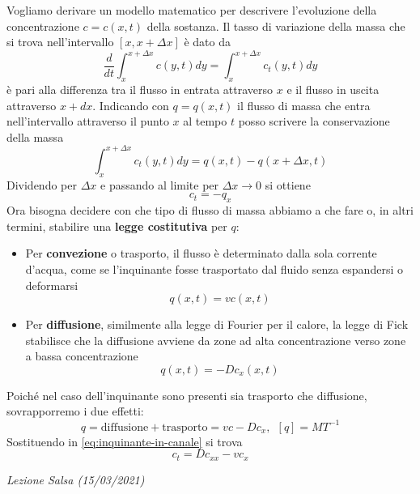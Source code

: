 \documentclass[10pt,a4paper,twoside,openright]{book}
\newcounter{conteggioS}
\newcommand{\LezioneS}[1]{
	\stepcounter{conteggioS}
	\textit{Lezione Salsa \arabic{conteggioS} (#1)}
	}
\begin{document}
Vogliamo derivare un modello matematico per descrivere l'evoluzione della concentrazione $\displaystyle c=c(x,t)$ della sostanza. Il tasso di variazione della massa che si trova nell'intervallo $\displaystyle [ x,x+\Delta x]$ è dato da
\begin{equation*}
\frac{d}{dt}\int ^{x+\Delta x}_{x} c(y,t) dy=\int ^{x+\Delta x}_{x} c_{t}(y,t) dy
\end{equation*}
è pari alla differenza tra il flusso in entrata attraverso $\displaystyle x$ e il flusso in uscita attraverso $\displaystyle x+dx$. Indicando con $\displaystyle q=q(x,t)$ il flusso di massa che entra nell'intervallo attraverso il punto $\displaystyle x$ al tempo $\displaystyle t$ posso scrivere la conservazione della massa
\begin{equation*}
\int ^{x+\Delta x}_{x} c_{t}(y,t) dy=q(x,t) -q(x+\Delta x,t)
\end{equation*}
Dividendo per $\displaystyle \Delta x$ e passando al limite per $\displaystyle \Delta x\rightarrow 0$ si ottiene
\begin{equation}
c_{t} =-q_{x}
\label{eq:inquinante-in-canale}
\end{equation}
Ora bisogna decidere con che tipo di flusso di massa abbiamo a che fare o, in altri termini, stabilire una \textbf{legge costitutiva }per $\displaystyle q$:
\begin{itemize}
\item Per \textbf{convezione} o trasporto, il flusso è determinato dalla sola corrente d'acqua, come se l'inquinante fosse trasportato dal fluido senza espandersi o deformarsi\begin{equation*}
q(x,t) =vc(x,t)
\end{equation*}
\item Per \textbf{diffusione}, similmente alla legge di Fourier per il calore, la legge di Fick stabilisce che la diffusione avviene da zone ad alta concentrazione verso zone a bassa concentrazione\begin{equation*}
q(x,t) =-Dc_{x}(x,t)
\end{equation*}
\end{itemize}

Poiché nel caso dell'inquinante sono presenti sia trasporto che diffusione, sovrapporremo i due effetti:
\begin{equation*}
q=\text{diffusione} +\text{trasporto} =vc-Dc_{x},\ \ [ q] =MT^{-1}
\end{equation*}
Sostituendo in \eqref{eq:inquinante-in-canale} si trova
\begin{equation*}
\boxed{c_{t} =Dc_{xx} -vc_{x}}
\end{equation*}
\LezioneS{15/03/2021}
\end{document}
